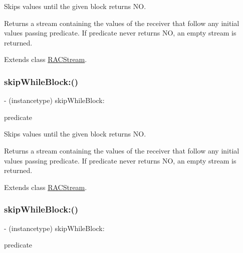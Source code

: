 Skips values until the given block returns {\ttfamily NO}.

Returns a stream containing the values of the receiver that follow any initial values passing {\ttfamily predicate}. If {\ttfamily predicate} never returns {\ttfamily NO}, an empty stream is returned. 

Extends class \mbox{\hyperlink{interface_r_a_c_stream_a1e323c308071aed5e01627d4d96ca9c8}{R\+A\+C\+Stream}}.

\mbox{\label{category_r_a_c_stream_07_operations_08_a1e323c308071aed5e01627d4d96ca9c8}} 
\subsubsection{\texorpdfstring{skip\+While\+Block\+:()}{skipWhileBlock:()}\hspace{0.1cm}{\footnotesize\ttfamily [2/3]}}
{\footnotesize\ttfamily -\/ (instancetype) skip\+While\+Block\+: \begin{DoxyParamCaption}\item[{(B\+O\+OL($^\wedge$)(id x))}]{predicate }\end{DoxyParamCaption}}

Skips values until the given block returns {\ttfamily NO}.

Returns a stream containing the values of the receiver that follow any initial values passing {\ttfamily predicate}. If {\ttfamily predicate} never returns {\ttfamily NO}, an empty stream is returned. 

Extends class \mbox{\hyperlink{interface_r_a_c_stream_a1e323c308071aed5e01627d4d96ca9c8}{R\+A\+C\+Stream}}.

\mbox{\label{category_r_a_c_stream_07_operations_08_a1e323c308071aed5e01627d4d96ca9c8}} 
\subsubsection{\texorpdfstring{skip\+While\+Block\+:()}{skipWhileBlock:()}\hspace{0.1cm}{\footnotesize\ttfamily [3/3]}}
{\footnotesize\ttfamily -\/ (instancetype) skip\+While\+Block\+: \begin{DoxyParamCaption}\item[{(B\+O\+OL($^\wedge$)(id x))}]{predicate }\end{DoxyParamCaption}}

